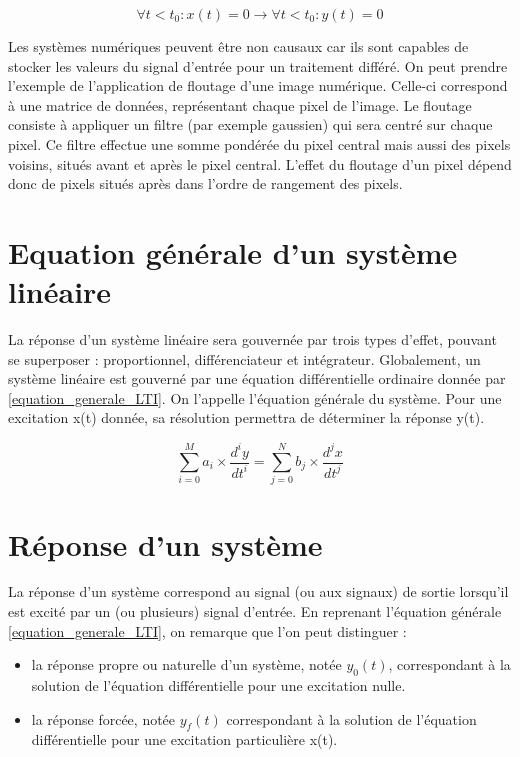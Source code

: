 	\begin{equation}\label{def_causal}
	\forall t < t_{0} : x(t) = 0 \rightarrow \forall t < t_{0} : y(t) = 0
	\end{equation}
	
	Les systèmes numériques peuvent être non causaux car ils sont capables de stocker les valeurs du signal d'entrée pour un traitement différé. On peut prendre l'exemple de l'application de floutage d'une image numérique. Celle-ci correspond à une matrice de données, représentant chaque pixel de l'image. Le floutage consiste à appliquer un filtre (par exemple gaussien) qui sera centré sur chaque pixel. Ce filtre effectue une somme pondérée du pixel central mais aussi des pixels voisins, situés avant et après le pixel central. L'effet du floutage d'un pixel dépend donc de pixels situés après dans l'ordre de rangement des pixels. 

	
	
	\section{Equation générale d'un système linéaire}
	La réponse d'un système linéaire sera gouvernée par trois types d'effet, pouvant se superposer : proportionnel, différenciateur et intégrateur. Globalement, un système linéaire est gouverné par une équation différentielle ordinaire donnée par \ref{equation_generale_LTI}. On l'appelle l'équation générale du système. Pour une excitation x(t) donnée, sa résolution permettra de déterminer la réponse y(t).
	
	\begin{equation}\label{equation_generale_LTI}
	\sum_{i=0}^M a_{i}\times \frac{d^{i}y}{dt^{i}} = \sum_{j=0}^N b_{j}\times \frac{d^{j}x}{dt^{j}}
	\end{equation}
	
	
	\section{Réponse d'un système}
	La réponse d'un système correspond au signal (ou aux signaux) de sortie lorsqu'il est excité par un (ou plusieurs) signal d'entrée. En reprenant l'équation générale \ref{equation_generale_LTI}, on remarque que l'on peut distinguer :
	\begin{itemize}
		\item la réponse propre ou naturelle d'un système, notée $y_{0}(t)$, correspondant à la solution de l'équation différentielle pour une excitation nulle.
		\item la réponse forcée, notée $y_{f}(t)$ correspondant à la solution de l'équation différentielle pour une excitation particulière x(t).
	\end{itemize}
	
